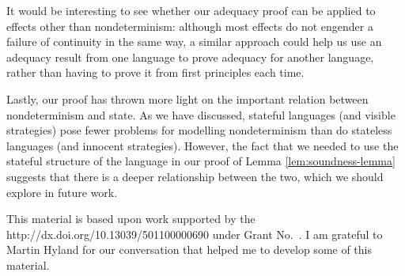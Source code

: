 \documentclass[sigplan,9pt,review]{acmart}\settopmatter{printfolios=true,printccs=false,printacmref=false}
\begin{document}
It would be interesting to see whether our adequacy proof can be applied to effects other than nondeterminism: although most effects do not engender a failure of continuity in the same way, a similar approach could help us use an adequacy result from one language to prove adequacy for another language, rather than having to prove it from first principles each time.

Lastly, our proof has thrown more light on the important relation between nondeterminism and state.  
As we have discussed, stateful languages (and visible strategies) pose fewer problems for modelling nondeterminism than do stateless languages (and innocent strategies).  
However, the fact that we needed to use the stateful structure of the language in our proof of Lemma \ref{lem:soundness-lemma} suggests that there is a deeper relationship between the two, which we should explore in future work.

\begin{acks}                            %
  This material is based upon work supported by the
  {http://dx.doi.org/10.13039/501100000690} under Grant
  No.~.   I am grateful to Martin Hyland for our conversation that helped me to develop some of this material.
\end{acks}



\end{document}
